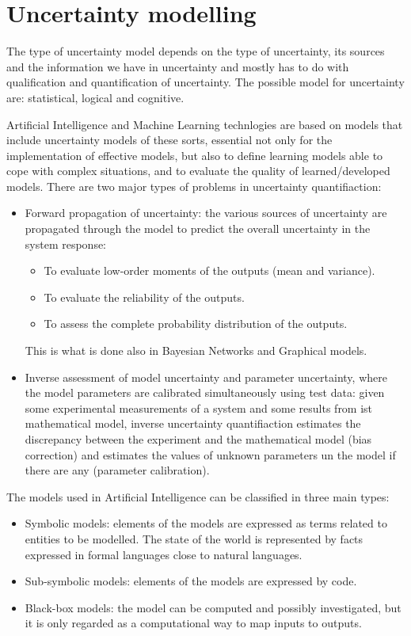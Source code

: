 \documentclass[12pt, a4paper]{report}
\theoremstyle{remark}
\theoremstyle{definition}
\begin{document}
    \section{Uncertainty modelling}
    The type of uncertainty model depends on the type of uncertainty, its sources and the information we have in uncertainty and mostly
    has to do with qualification and quantification of uncertainty. The possible model for uncertainty are: statistical, logical and
    cognitive.

    Artificial Intelligence and Machine Learning technlogies are based on models that include uncertainty models of these sorts, essential
    not only for the implementation of effective models, but also to define learning models able to cope with complex situations, and 
    to evaluate the quality of learned/developed models. 
    There are two major types of problems in uncertainty quantifiaction: 
    \begin{itemize}
        \item Forward propagation of uncertainty: the various sources of uncertainty are propagated through the model to predict the overall
            uncertainty in the system response:
            \begin{itemize}
                \item To evaluate low-order moments of the outputs (mean and variance).
                \item To evaluate the reliability of the outputs.
                \item To assess the complete probability distribution of the outputs. 
            \end{itemize}
            This is what is done also in Bayesian Networks and Graphical models. 
        \item Inverse assessment of model uncertainty and parameter uncertainty, where the model parameters are calibrated simultaneously
            using test data: given some experimental measurements of a system and some results from ist mathematical model, inverse 
            uncertainty quantifiaction estimates the discrepancy between the experiment and the mathematical model (bias correction) and
            estimates the values of unknown parameters un the model if there are any (parameter calibration).
    \end{itemize}
    The models used in Artificial Intelligence can be classified in three main types: 
    \begin{itemize}
        \item Symbolic models: elements of the models are expressed as terms related to entities to be modelled. The state of the world is
            represented by facts expressed in formal languages close to natural languages.
        \item Sub-symbolic models: elements of the models are expressed by code. 
        \item Black-box models: the model can be computed and possibly investigated, but it is only regarded as a computational way to map
            inputs to outputs. 
    \end{itemize}
\end{document}
